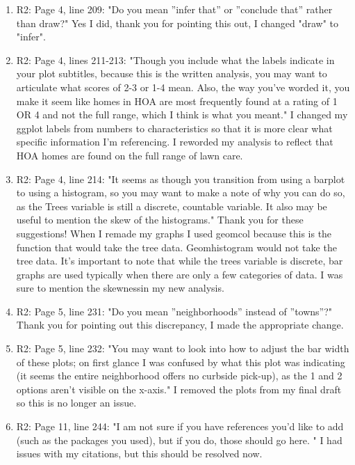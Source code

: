 \documentclass{article}
\begin{document}
\begin{enumerate}
  \item R2: Page 4, line 209: "Do you mean ”infer that” or ”conclude that” rather than draw?" Yes I did, thank you for pointing this out, I changed "draw" to "infer". 
  \item R2: Page 4, lines 211-213: "Though you include what the labels indicate in your plot subtitles, because this is the written analysis, you may want to articulate what scores of 2-3 or 1-4 mean. Also, the way you’ve worded it, you make it seem like homes in HOA are most frequently found at a rating of 1 OR 4 and not the full range, which I think is what you meant." I changed my ggplot labels from numbers to characteristics so that it is more clear what specific information I'm referencing. I reworded my analysis to reflect that HOA homes are found on the full range of lawn care. 
  \item R2: Page 4, line 214: "It seems as though you transition from using a barplot to using a histogram, so you may want to make a note of why you can do so, as the Trees variable is still a discrete, countable variable. It also may be useful to mention the skew of the histograms." Thank you for these suggestions! When I remade my graphs I used geomcol because this is the function that would take the tree data. Geomhistogram would not take the tree data. It's important to note that while the trees variable is discrete, bar graphs are used typically when there are only a few categories of data. I was sure to mention the skewnessin my new analysis. 
  \item R2: Page 5, line 231: "Do you mean ”neighborhoods” instead of ”towns”?" Thank you for pointing out this discrepancy, I made the appropriate change. 
  \item R2: Page 5, line 232: "You may want to look into how to adjust the bar width of these plots; on first glance I was confused by what this plot was indicating (it seems the entire neighborhood offers no curbside pick-up), as the 1 and 2 options aren’t visible on the x-axis." I removed the plots from my final draft so this is no longer an issue.  
  \item R2: Page 11, line 244: "I am not sure if you have references you’d like to add (such as the packages you used), but if you do, those should go here. " I had issues with my citations, but this should be resolved now.


\end{enumerate}
\end{document}
